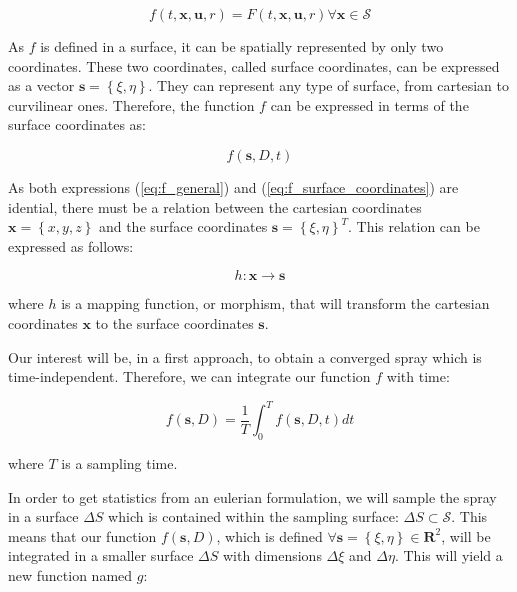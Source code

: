 \begin{equation}
\label{eq:f_general}
 f \left( t, \textbf{x}, \textbf{u}, r \right) = F \left( t, \textbf{x}, \textbf{u}, r \right) \forall \mathrm{\boldsymbol{x} \in \mathcal{S}} 
\end{equation}

As $f$ is defined in a surface, it can be spatially represented by only two coordinates. These two coordinates, called surface coordinates, can be expressed as a vector $\boldsymbol{s} = \left\lbrace \xi, \eta \right\rbrace$. They can represent any type of surface, from cartesian to curvilinear ones. Therefore, the function $f$ can be expressed in terms of the surface coordinates as:

\begin{equation}
\label{eq:f_surface_coordinates}
f \left( \boldsymbol{s}, D, t \right)  
\end{equation}

As both expressions (\ref{eq:f_general}) and (\ref{eq:f_surface_coordinates}) are idential, there must be a relation between the cartesian coordinates $\boldsymbol{x} = \left\lbrace x, y, z \right\rbrace$ and the surface coordinates $\boldsymbol{s} = \left\lbrace \xi, \eta \right\rbrace^T$. This relation can be expressed as follows:

\begin{equation}
\label{eq:morphism_general_definition}
h : \boldsymbol{x} \rightarrow \boldsymbol{s}
\end{equation}


where $h$ is a mapping function, or morphism, that will transform the cartesian coordinates $\boldsymbol{x}$ to the surface coordinates $\boldsymbol{s}$.

Our interest will be, in a first approach, to obtain a converged spray which is time-independent. Therefore, we can integrate our function $f$ with time:

\begin{equation}
\label{eq:f_general_time_integrated}
f \left( \boldsymbol{s}, D \right) = \frac{1}{T} \int_0^T f \left( \boldsymbol{s}, D, t \right) dt
\end{equation}

where $T$ is a sampling time. 

In order to get statistics from an eulerian formulation, we will sample the spray in a surface $\Delta S$ which is contained within the sampling surface: $\Delta S \subset \mathcal{S}$. This means that our function $f \left( \boldsymbol{s}, D \right)$, which is defined $\forall \boldsymbol{s} = \left\lbrace \xi, \eta \right\rbrace \in \boldsymbol{R}^2$, will be integrated in a smaller surface $\Delta S$ with dimensions $\Delta \xi$ and $\Delta \eta$. This will yield a new function named $g$:

